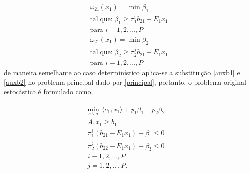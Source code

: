 \begin{align}
	\label{auxb1}
&\omega_{21}(x_1) = \min  \beta_{1}\nonumber \\
	&\mbox{tal que: }\beta_{1}  \geq {\pi}_{1}^{i}b_{21} - E_1 x_1 \\
	&\mbox{para }i = 1,2,\dots, P  \nonumber
  \end{align}
\begin{align}
	\label{auxb2}
&\omega_{21}(x_1) = \min  \beta_{2}\nonumber \\
	&\mbox{tal que: }\beta_{2}  \geq {\pi}_{2}^{j}b_{21} - E_1 x_1 \\
	&\mbox{para }i = 1,2,\dots, P  \nonumber
  \end{align}
 de maneira semelhante ao caso determin\'istico aplica-se a substitui\c c\~ao \ref{auxb1} e \ref{auxb2} no problema
 principal  dado por \ref{principal}, portanto, o problema original estoc\'astico \'e formulado como,

 \begin{align}
 \begin{aligned}
	\underset {s \backslash a} {\text{min}} \ \ \langle c_1,x_1\rangle + p_1 {\beta}_{1} + p_2 {\beta}_{2} \\
	A_1 x_1 \geq b_1 \\
	{\pi}_{1}^{i}(b_{21} - E_1x_1) - {\beta}_{1} \leq 0 \\ 
	{\pi}_{2}^{j}(b_{22} - E_1x_1) - {\beta}_{2} \leq 0 \\ 
	i = 1, 2, \dots , P \\
	j = 1, 2, \dots , P. \\
  \end{aligned}
  \label{pd5}
\end{align}

